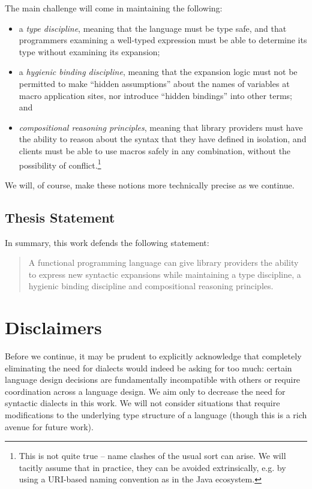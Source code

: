 The main challenge will come in maintaining the following:
\begin{itemize}
\item a \emph{type discipline}, meaning that the language must be type safe, and that programmers examining a well-typed expression must be able to determine its type without examining its expansion; 
\item a \emph{hygienic binding discipline}, meaning that the expansion logic must not be permitted to make ``hidden assumptions'' about the names of variables at macro application sites, nor  introduce ``hidden bindings'' into other terms; and 
\item \emph{compositional reasoning principles}, meaning that library providers must have the ability to reason about the syntax that they have defined in isolation, and clients must be able to use macros safely in any combination, without the possibility of conflict.\footnote{This is not quite true --  name clashes of the usual sort can arise. We will tacitly assume that in practice, they can be avoided extrinsically, e.g. by using a URI-based naming convention as in the Java ecosystem.} 
\end{itemize}
\noindent
We will, of course, make these notions more technically precise as we continue.

\subsection*{Thesis Statement}
In summary, this work defends the following statement:

\begin{quote}
A functional programming language can give library providers the ability to %
express new syntactic expansions while maintaining a type discipline, a hygienic binding discipline and compositional reasoning principles. %
\end{quote}
\section{Disclaimers}
Before we continue, it may be prudent to explicitly acknowledge that completely eliminating the need for dialects would indeed be asking for too much: certain language design decisions are fundamentally incompatible with others or require coordination across a language design. We aim only to decrease the need for syntactic dialects in this work. We will not consider situations that require modifications to the underlying type structure of a language (though this is a rich avenue for future work). %

